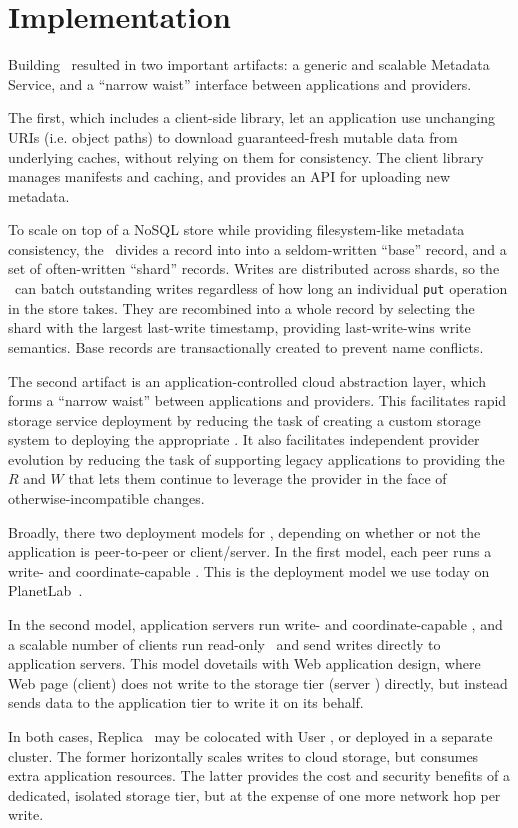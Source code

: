 \section{Implementation}
\label{sec:implementation}

Building \Syndicate\ resulted in two important artifacts: a generic
and scalable Metadata Service, and a ``narrow waist'' interface
between applications and providers.

The first, which includes a client-side library, let an
application use unchanging URIs (i.e. object paths) to download guaranteed-fresh mutable
data from underlying caches, without relying on them for consistency.
The client library manages manifests and caching, and provides 
an API for uploading new metadata.

To scale on top of a NoSQL store while providing filesystem-like metadata 
consistency, the \MS\ divides a record into
into a seldom-written ``base'' record, and a set of often-written ``shard'' records.
Writes are distributed across shards, so the \MS\ can batch outstanding writes
regardless of how long an individual {\tt put} operation in the store takes.
They are recombined into a whole record by selecting the shard with the largest 
last-write timestamp, providing last-write-wins write semantics.  Base records are 
transactionally created to prevent name conflicts.

The second artifact is an application-controlled cloud
abstraction layer, which forms a ``narrow waist''
between applications and providers.  This facilitates rapid storage service 
deployment by reducing the task of creating a custom storage system to deploying
the appropriate \SGs.  It also facilitates 
independent provider evolution by reducing the task of supporting legacy applications
to providing the $R$ and $W$ that lets them continue to
leverage the provider in the face of otherwise-incompatible changes.

Broadly, there two deployment models for \Syndicate, depending on whether 
or not the application is peer-to-peer or client/server.  In the first model, 
each peer runs a write- and coordinate-capable \SG.  This is the deployment 
model we use today on PlanetLab~\cite{PlanetLab}.

In the second model, application servers run write- and coordinate-capable \SGs,
and a scalable number of clients run read-only \SGs\ and send writes directly to 
application servers.  This model dovetails with Web
application design, where Web page (client) does not write to the storage tier 
(server \SG) directly, but instead sends data to the application tier to write 
it on its behalf.

In both cases, Replica \SGs\ may be colocated with User \SGs, or deployed
in a separate cluster.  The former horizontally scales 
writes to cloud storage, but consumes extra application resources.  The latter provides the 
cost and security benefits of a dedicated, isolated storage tier,
but at the expense of one more network hop per write.
